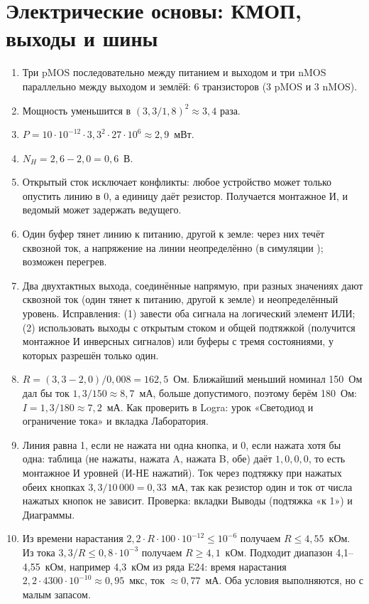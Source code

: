 \section*{Электрические основы: КМОП, выходы и шины}
\begin{enumerate}
  \item {} Три pMOS последовательно между питанием и выходом и три nMOS параллельно между выходом и землёй: 6 транзисторов (3 pMOS и 3 nMOS).
  \item {} Мощность уменьшится в $(3{,}3/1{,}8)^2\approx 3{,}4$ раза.
  \item {} $P = 10\cdot 10^{-12}\cdot 3{,}3^2\cdot 27\cdot 10^6 \approx 2{,}9$~мВт.
  \item {} $N_H = 2{,}6 - 2{,}0 = 0{,}6$~В.
  \item {} Открытый сток исключает конфликты: любое устройство может только опустить линию в 0, а единицу даёт резистор. Получается монтажное И, и ведомый может задержать ведущего.
  \item {} Один буфер тянет линию к питанию, другой к земле: через них течёт сквозной ток, а напряжение на линии неопределённо (в симуляции ); возможен перегрев.
  \item {} Два двухтактных выхода, соединённые напрямую, при разных значениях дают сквозной ток (один тянет к питанию, другой к земле) и неопределённый уровень. Исправления: (1) завести оба сигнала на логический элемент ИЛИ; (2) использовать выходы с открытым стоком и общей подтяжкой (получится монтажное И инверсных сигналов) или буферы с тремя состояниями, у которых разрешён только один.
  \item {} $R=(3{,}3-2{,}0)/0{,}008=162{,}5$~Ом. Ближайший меньший номинал 150~Ом дал бы ток $1{,}3/150\approx 8{,}7$~мА, больше допустимого, поэтому берём 180~Ом: $I=1{,}3/180\approx 7{,}2$~мА. Как проверить в Logra: урок «Светодиод и ограничение тока» и вкладка Лаборатория.
  \item {} Линия равна 1, если не нажата ни одна кнопка, и 0, если нажата хотя бы одна: таблица (не нажаты, нажата A, нажата B, обе) даёт $1,0,0,0$, то есть монтажное И уровней (И-НЕ нажатий). Ток через подтяжку при нажатых обеих кнопках $3{,}3/10\,000=0{,}33$~мА, так как резистор один и ток от числа нажатых кнопок не зависит. Проверка: вкладки Выводы (подтяжка «к 1») и Диаграммы.
  \item {} Из времени нарастания $2{,}2\cdot R\cdot 100\cdot 10^{-12}\le 10^{-6}$ получаем $R\le 4{,}55$~кОм. Из тока $3{,}3/R\le 0{,}8\cdot 10^{-3}$ получаем $R\ge 4{,}1$~кОм. Подходит диапазон 4,1--4,55~кОм, например 4,3~кОм из ряда E24: время нарастания $2{,}2\cdot4300\cdot10^{-10}\approx 0{,}95$~мкс, ток $\approx 0{,}77$~мА. Оба условия выполняются, но с малым запасом.
\end{enumerate}


